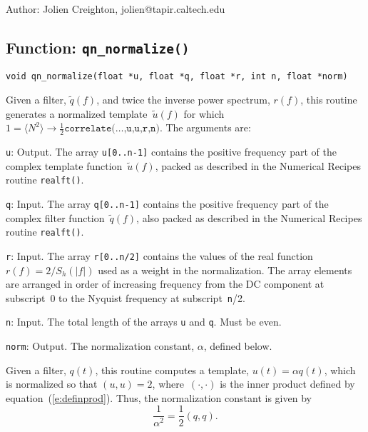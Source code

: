 \begin{description}
\item{Author:}  Jolien Creighton, jolien@tapir.caltech.edu
\end{description}


\clearpage
\subsection{Function: \texttt{qn\_normalize()}}

\begin{verbatim}
void qn_normalize(float *u, float *q, float *r, int n, float *norm)
\end{verbatim}
Given a filter, $\tilde{q}(f)$, and twice the inverse power spectrum, $r(f)$,
this routine generates a normalized template~$\tilde{u}(f)$ for which
$1=\langle N^2\rangle\to\frac{1}{2}\texttt{correlate(\ldots,u,u,r,n)}$.
The arguments are:
\begin{description}
\item{\texttt{u}}: Output.  The array \texttt{u[0..n-1]} contains the
  positive frequency part of the complex template function~$\tilde{u}(f)$,
  packed as described in the Numerical Recipes routine \texttt{realft()}.
\item{\texttt{q}}: Input.  The array \texttt{q[0..n-1]} contains the
  positive frequency part of the complex filter function~$\tilde{q}(f)$, also
  packed as described in the Numerical Recipes routine \texttt{realft()}.
\item{\texttt{r}}: Input.  The array \texttt{r[0..n/2]} contains the values
  of the real function $r(f)=2/S_h(|f|)$ used as a weight in the
  normalization.  The array elements are arranged in order of increasing
  frequency from the DC component at subscript~0 to the Nyquist frequency
  at subscript~\texttt{n}/2.
\item{\texttt{n}}: Input.  The total length of the arrays \texttt{u} and
  \texttt{q}.  Must be even.
\item{\texttt{norm}}: Output.  The normalization constant, $\alpha$, defined
  below.
\end{description}

Given a filter, $q(t)$, this routine computes a template, $u(t)=\alpha q(t)$,
which is normalized so that $(u,u)=2$, where~$(\cdot,\cdot)$ is the inner
product defined by equation~(\ref{e:definprod}).  Thus, the normalization
constant is given by
\begin{equation}
  \frac{1}{\alpha^2} = \frac{1}{2}(q,q).
\end{equation}

